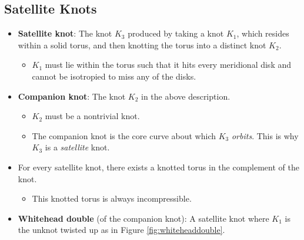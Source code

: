 \documentclass[titlepage]{article}
\numberwithin{figure}{section}
\numberwithin{table}{section}
\numberwithin{equation}{section}
\begin{document}
\subsection{Satellite Knots}
\begin{itemize}
    \item \textbf{Satellite knot}: The knot $K_3$ produced by taking a knot $K_1$, which resides within a solid torus, and then knotting the torus into a distinct knot $K_2$.
    \begin{itemize}
        \item $K_1$ must lie within the torus such that it hits every meridional disk and cannot be isotropied to miss any of the disks.
    \end{itemize}
    \item \textbf{Companion knot}: The knot $K_2$ in the above description.
    \begin{itemize}
        \item $K_2$ must be a nontrivial knot.
        \item The companion knot is the core curve about which $K_3$ \emph{orbits}. This is why $K_3$ is a \emph{satellite} knot.
    \end{itemize}
    \item For every satellite knot, there exists a knotted torus in the complement of the knot.
    \begin{itemize}
        \item This knotted torus is always incompressible.
    \end{itemize}
    \item \textbf{Whitehead double} (of the companion knot): A satellite knot where $K_1$ is the unknot twisted up as in Figure \ref{fig:whiteheaddouble}.
    \begin{figure}[h!]
        \centering
\end{figure}
\end{itemize}
\end{document}
